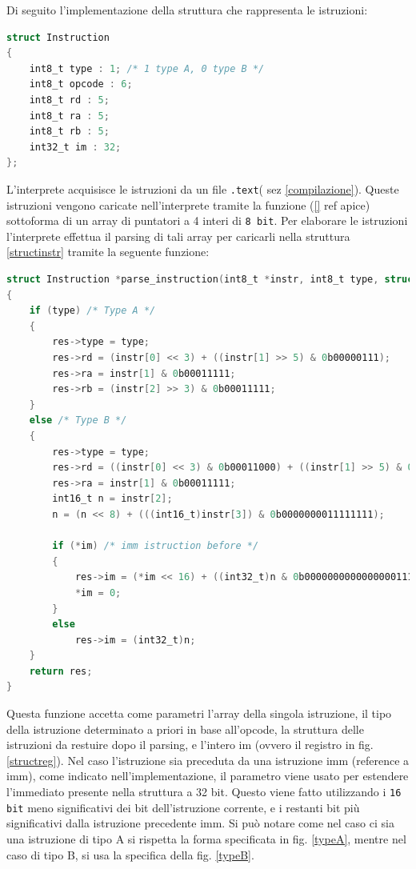 \vspace{0.3cm}

\noindent Di seguito l'implementazione della struttura che rappresenta le istruzioni:

\begin{lstlisting}[language=C]
struct Instruction 
{
    int8_t type : 1; /* 1 type A, 0 type B */
    int8_t opcode : 6;
    int8_t rd : 5;
    int8_t ra : 5;
    int8_t rb : 5;
    int32_t im : 32;
};
\end{lstlisting}
\label{structinstr}

\vspace{0.2cm}

\noindent L'interprete acquisisce le istruzioni da un file \texttt{.text}( sez \ref{compilazione}).  Queste istruzioni vengono caricate nell'interprete tramite la funzione (\ref{} ref apice) sottoforma di un array di puntatori a 4 interi di \texttt{8 bit}. Per elaborare le istruzioni l'interprete effettua il parsing di tali array per caricarli nella struttura \ref{structinstr} tramite la seguente funzione:

\begin{lstlisting}[language=C,label={parseinstr},caption={Parse Instruction}]
struct Instruction *parse_instruction(int8_t *instr, int8_t type, struct Instruction *res, int16_t *im)
{
	if (type) /* Type A */
	{
		res->type = type;
		res->rd = (instr[0] << 3) + ((instr[1] >> 5) & 0b00000111);
		res->ra = instr[1] & 0b00011111;
		res->rb = (instr[2] >> 3) & 0b00011111;
	}
	else /* Type B */
	{
		res->type = type;
		res->rd = ((instr[0] << 3) & 0b00011000) + ((instr[1] >> 5) & 0b00000111);
		res->ra = instr[1] & 0b00011111;
		int16_t n = instr[2];
		n = (n << 8) + (((int16_t)instr[3]) & 0b0000000011111111);

		if (*im) /* imm istruction before */
		{
			res->im = (*im << 16) + ((int32_t)n & 0b00000000000000001111111111111111);
			*im = 0;
		}
		else
			res->im = (int32_t)n;
	}
	return res;
}
\end{lstlisting}

Questa funzione accetta come parametri l'array della singola istruzione, il tipo della istruzione determinato a priori in base all'opcode, la struttura delle istruzioni da restuire dopo il parsing, e l'intero im (ovvero il registro in fig. \ref{structreg}). Nel caso l'istruzione sia preceduta da una istruzione imm (reference a imm),  come indicato nell'implementazione, il parametro viene usato per estendere l'immediato presente nella struttura a 32 bit. Questo viene fatto utilizzando i \texttt{16 bit} meno significativi dei bit dell'istruzione corrente, e i restanti bit più significativi dalla istruzione precedente imm. 
Si può notare come nel caso ci sia una istruzione di tipo A si rispetta la forma specificata in fig. \ref{typeA}, mentre nel caso di tipo B, si usa la specifica della fig. \ref{typeB}.

